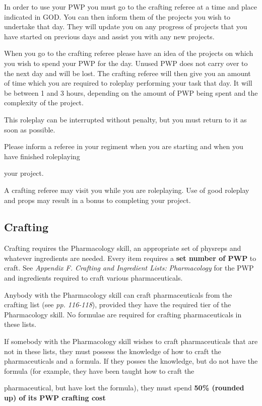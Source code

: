 \documentclass{scrbook}
\begin{document}
In order to use your PWP you must go to the crafting referee at a time and place indicated in GOD. You can then inform them of the projects you wish to undertake that day. They will update you on any progress of projects that you have started on previous days and assist you with any new projects.

When you go to the crafting referee please have an idea of the projects on which you wish to spend your PWP for the day. Unused PWP does not carry over to the next day and will be lost. The crafting referee will then give you an amount of time which you are required to roleplay performing your task that day. It will be between 1 and 3 hours, depending on the amount of PWP being spent and the complexity of the project.

This roleplay can be interrupted without penalty, but you must return to it as soon as possible.

Please inform a referee in your regiment when you are starting and when you have finished roleplaying

your project.

A crafting referee may visit you while you are roleplaying. Use of good roleplay and props may result in a bonus to completing your project.

\subsection{Crafting}

Crafting requires the Pharmacology skill, an appropriate set of physreps and whatever ingredients are needed. Every item requires a \textbf{set number of PWP} to craft. See \textit{Appendix F. Crafting and Ingredient Lists:} \textit{Pharmacology} for the PWP and ingredients required to craft various pharmaceuticals.

Anybody with the Pharmacology skill can craft pharmaceuticals from the crafting list (see \textit{pp. 116-118}), provided they have the required tier of the Pharmacology skill. No formulae are required for crafting pharmaceuticals in these lists.

If somebody with the Pharmacology skill wishes to craft pharmaceuticals that are not in these lists, they must possess the knowledge of how to craft the pharmaceuticals and a formula. If they posses the knowledge, but do not have the formula (for example, they have been taught how to craft the

pharmaceutical, but have lost the formula), they must spend \textbf{50\% (rounded up) of its PWP crafting cost}
\end{document}
